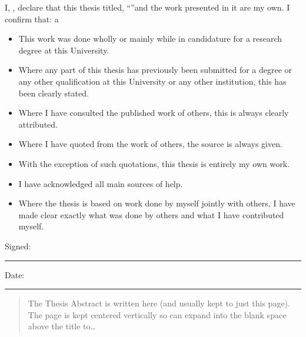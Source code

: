 \documentclass[
    11pt,
    oneside, %
    english,
    singlespacing, %
parskip, %
]{MastersDoctoralThesis}
\begin{document}
    \begin{declaration}
        \addchaptertocentry{\authorshipname} %
        \noindent I, \authorname, declare that this thesis titled, \enquote{\ttitle}and the work presented in it are my own.
        I confirm that:
a
        \begin{itemize}
            \item This work was done wholly or mainly while in candidature for a research degree at this University.
            \item Where any part of this thesis has previously been submitted for a degree or any other qualification at this University or any other institution, this has been clearly stated.
            \item Where I have consulted the published work of others, this is always clearly attributed.
            \item Where I have quoted from the work of others, the source is always given.
            \item With the exception of such quotations, this thesis is entirely my own work.
            \item I have acknowledged all main sources of help.
            \item Where the thesis is based on work done by myself jointly with others, I have made clear exactly what was done by others and what I have contributed myself.\\
        \end{itemize}

        \noindent Signed:\\
        \rule[0.5em]{25em}{0.5pt} %

        \noindent Date:\\
        \rule[0.5em]{25em}{0.5pt} %
    \end{declaration}



    \begin{abstract}
        \addchaptertocentry{\abstractname} %
        The Thesis Abstract is written here (and usually kept to just this page).
        The page is kept centered vertically so can expand into the blank space above the title to\ldots
    \end{abstract}
\end{document}
